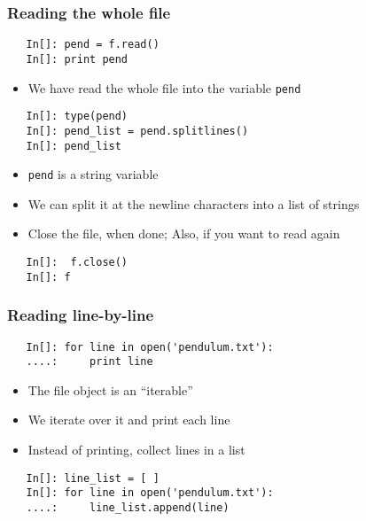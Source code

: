 \begin{frame}[fragile]
  \frametitle{Reading the whole file}
  \begin{lstlisting}
   In[]: pend = f.read()
   In[]: print pend
  \end{lstlisting}
  \begin{itemize}
  \item We have read the whole file into the variable \texttt{pend}
  \end{itemize}
  \begin{lstlisting}
   In[]: type(pend)
   In[]: pend_list = pend.splitlines()
   In[]: pend_list
  \end{lstlisting}
  \begin{itemize}
  \item  \texttt{pend} is a string variable
  \item We can split it at the newline characters into a list of
    strings
  \item Close the file, when done; Also, if you want to read again
  \end{itemize}
  \begin{lstlisting}
   In[]:  f.close()
   In[]: f
  \end{lstlisting}
\end{frame}

\begin{frame}[fragile]
  \frametitle{Reading line-by-line}
  \begin{lstlisting}
   In[]: for line in open('pendulum.txt'):
   ....:     print line
  \end{lstlisting}
  \begin{itemize}
  \item The file object is an ``iterable''
  \item We iterate over it and print each line
  \item Instead of printing, collect lines in a list
  \end{itemize}
  \begin{lstlisting}
   In[]: line_list = [ ]
   In[]: for line in open('pendulum.txt'):
   ....:     line_list.append(line)
  \end{lstlisting}
\end{frame}


